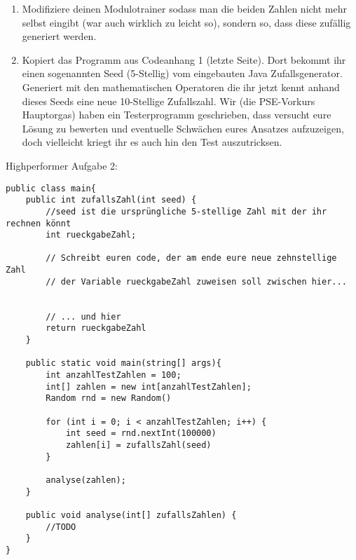 \documentclass{../../sheet}
\begin{document}
\begin{enumerate}
    \item Modifiziere deinen Modulotrainer sodass man die beiden Zahlen nicht mehr selbst eingibt (war auch wirklich zu leicht so), sondern so, dass diese zufällig generiert werden.
    \item Kopiert das Programm aus Codeanhang 1 (letzte Seite). Dort bekommt ihr einen sogenannten Seed (5-Stellig) vom eingebauten Java Zufallsgenerator. Generiert mit den mathematischen Operatoren die ihr jetzt kennt anhand dieses Seeds eine neue 10-Stellige Zufallszahl. Wir (die PSE-Vorkurs Hauptorgas) haben ein Testerprogramm geschrieben, dass versucht eure Lösung zu bewerten und eventuelle Schwächen eures Ansatzes aufzuzeigen, doch vielleicht kriegt ihr es auch hin den Test auszutricksen.
\end{enumerate}

\newpage
{}
Highperformer Aufgabe 2:
\begin{verbatim}
public class main{
    public int zufallsZahl(int seed) {
        //seed ist die ursprüngliche 5-stellige Zahl mit der ihr rechnen könnt
        int rueckgabeZahl;

        // Schreibt euren code, der am ende eure neue zehnstellige Zahl
        // der Variable rueckgabeZahl zuweisen soll zwischen hier...


        // ... und hier
        return rueckgabeZahl
    }

    public static void main(string[] args){
        int anzahlTestZahlen = 100;
        int[] zahlen = new int[anzahlTestZahlen];
        Random rnd = new Random()

        for (int i = 0; i < anzahlTestZahlen; i++) {
            int seed = rnd.nextInt(100000)
            zahlen[i] = zufallsZahl(seed)
        }

        analyse(zahlen);
    }

    public void analyse(int[] zufallsZahlen) {
        //TODO
    }
}
\end{verbatim}
\end{document}
